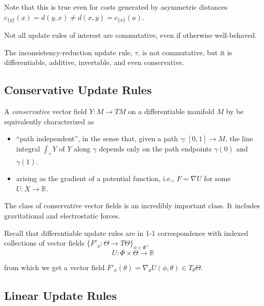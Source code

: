 \documentclass{article}
\begin{document}
Note that this is true even for costs generated by asymmetric distances $c_{\{y\}}(x) = d(y, x) \ne d(x,y) = c_{\{x\}}(a)$.

Not all update rules of interest are commutative, even if otherwise well-behaved.

\begin{example}
    The inconsistency-reduction update rule, $\tau$, is not commutative, but it is differentiable, additive, invertable, and even conservative.
\end{example}


\subsection{Conservative Update Rules}

A \emph{conservative} vector field $Y : M \to T M$ on a differentiable manifold $M$ by be equivalently characterized as 
\begin{itemize}
    \item ``path independent'', in the sense that, given a path $\gamma : [0,1] \to M$, the line integral
    $\int_\gamma Y$ of $Y$ along $\gamma$
     depends only on the path endpoints $\gamma(0)$ and $\gamma(1)$. 
    \item 
        arising as the gradient of a potential function, i.e., $F = \nabla U$ for some $U : X \to \mathbb R$.  
\end{itemize}
The class of conservative vector fields is an incredibly important class. 
It includes gravitational and electrostatic forces.  

Recall that differentiable update rules are in 1-1 correspondence with indexed
collections of vector fields $\{ F'_\phi : \Theta \to T\Theta \}_{\phi \in \Phi}$, 
\[
    U : \Phi \times \Theta\to \mathbb R
\]

from which we get a vector field $F'_\phi(\theta) = \nabla_{\theta} U(\phi, \theta) \in T_{\theta} \Theta$.


\subsection{Linear Update Rules}
\end{document}
